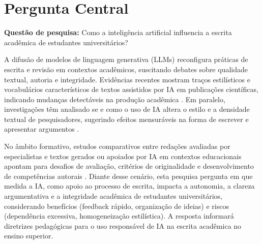 \section{Pergunta Central}\label{sec:pergunta-central}
\noindent\textbf{Questão de pesquisa:} Como a inteligência artificial influencia a escrita acadêmica de estudantes universitários?

A difusão de modelos de linguagem generativa (LLMs) reconfigura práticas de escrita e revisão em contextos acadêmicos, suscitando debates sobre qualidade textual, autoria e integridade. Evidências recentes mostram traços estilísticos e vocabulários característicos de textos assistidos por IA em publicações científicas, indicando mudanças detectáveis na produção acadêmica \cite{kobak2025llm}. Em paralelo, investigações têm analisado se e como o uso de IA altera o estilo e a densidade textual de pesquisadores, sugerindo efeitos mensuráveis na forma de escrever e apresentar argumentos .

No âmbito formativo, estudos comparativos entre redações avaliadas por especialistas e textos gerados ou apoiados por IA em contextos educacionais apontam para desafios de avaliação, critérios de originalidade e desenvolvimento de competências autorais \cite{yeadon2024ai}. Diante desse cenário, esta pesquisa pergunta em que medida a IA, como apoio ao processo de escrita, impacta a autonomia, a clareza argumentativa e a integridade acadêmica de estudantes universitários, considerando benefícios (feedback rápido, organização de ideias) e riscos (dependência excessiva, homogeneização estilística). A resposta informará diretrizes pedagógicas para o uso responsável de IA na escrita acadêmica no ensino superior.